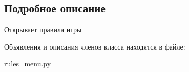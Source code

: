 \subsection{Подробное описание}
Открывает правила игры 



Объявления и описания членов класса находятся в файле\+:\begin{DoxyCompactItemize}
\item 
rules\+\_\+menu.\+py\end{DoxyCompactItemize}
